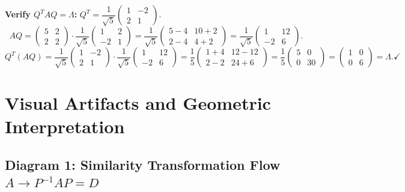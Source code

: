 \documentclass[12pt,a4paper]{article}
\begin{document}
\textbf{Verify $Q^TAQ = \Lambda$:}
$Q^T = \dfrac{1}{\sqrt{5}}\begin{pmatrix}1&-2\\2&1\end{pmatrix}$.
\[
  AQ = \begin{pmatrix}5&2\\2&2\end{pmatrix}\cdot\dfrac{1}{\sqrt{5}}\begin{pmatrix}1&2\\-2&1\end{pmatrix}
     = \dfrac{1}{\sqrt{5}}\begin{pmatrix}5-4&10+2\\2-4&4+2\end{pmatrix}
     = \dfrac{1}{\sqrt{5}}\begin{pmatrix}1&12\\-2&6\end{pmatrix}.
\]
\[
  Q^T(AQ) = \dfrac{1}{\sqrt{5}}\begin{pmatrix}1&-2\\2&1\end{pmatrix}\cdot\dfrac{1}{\sqrt{5}}\begin{pmatrix}1&12\\-2&6\end{pmatrix}
           = \dfrac{1}{5}\begin{pmatrix}1+4&12-12\\2-2&24+6\end{pmatrix}
           = \dfrac{1}{5}\begin{pmatrix}5&0\\0&30\end{pmatrix}
           = \begin{pmatrix}1&0\\0&6\end{pmatrix} = \Lambda. \checkmark
\]

\section{Visual Artifacts and Geometric Interpretation}

\subsection*{Diagram 1: Similarity Transformation Flow $A \to P^{-1}AP = D$}
\end{document}
